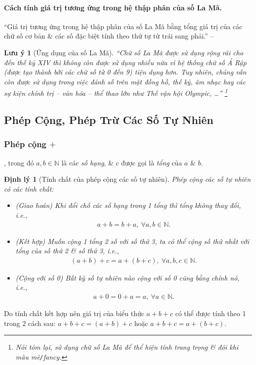 \documentclass{article}
\numberwithin{equation}{section}
\newtheorem{theorem}{Định lý}[section]
\newtheorem{remark}{Lưu ý}[section]
\begin{document}
\paragraph{Cách tính giá trị tương ứng trong hệ thập phân của số La Mã.} ``Giá trị tương ứng trong hệ thập phân của số La Mã bằng tổng giá trị của các chữ số cơ bản \& các số đặc biệt tính theo thứ tự từ trái sang phải.'' -- \cite[p. 14]{Thai_Anh_Dat_Ha_Loan_Nam_Quang_Toan_6_tap_1}

\begin{remark}[Ứng dụng của số La Mã]
	``Chữ số La Mã được sử dụng rộng rãi cho đến thế kỷ XIV thì không còn được sử dụng nhiều nữa vì hệ thống chữ số Ả Rập (được tạo thành bởi các chữ số từ 0 đến 9) tiện dụng hơn. Tuy nhiên, chúng vẫn còn được sử dụng trong việc đánh số trên mặt đồng hồ, thế kỷ, âm nhạc hay các sự kiện chính trị -- văn hóa -- thể thao lớn như Thế vận hội Olympic, \ldots'' \footnote{Nói tóm lại, sử dụng chữ số La Mã để thể hiện tính trang trọng \& đôi khi màu mè\texttt{/}fancy.}
\end{remark}

\subsection{Phép Cộng, Phép Trừ Các Số Tự Nhiên}

\subsubsection{Phép cộng $+$}
, trong đó $a,b\in\mathbb{N}$ là các \textit{số hạng}, \& $c$ được gọi là \textit{tổng} của $a$ \& $b$.

\begin{theorem}[Tính chất của phép cộng các số tự nhiên]
	Phép cộng các số tự nhiên có các tính chất:
	\begin{itemize}
		\item (Giao hoán) Khi đổi chỗ các số hạng trong 1 tổng thì tổng không thay đổi, i.e.,
		\begin{align*}
			a + b = b + a,\ \forall a,b\in\mathbb{N}.
		\end{align*}
		\item (Kết hợp) Muốn cộng 1 tổng 2 số với số thứ 3, ta có thể cộng số thứ nhất với tổng của số thứ 2 \& số thứ 3, i.e.,
		\begin{align*}
			(a + b) + c = a +(b + c),\ \forall a,b,c\in\mathbb{N}.
		\end{align*}
		\item (Cộng với số 0) Bất kỳ số tự nhiên nào cộng với số 0 cũng bằng chính nó, i.e.,
		\begin{align*}
			a + 0 = 0 + a = a,\ \forall a\in\mathbb{N}.
		\end{align*}
	\end{itemize}
\end{theorem}
Do tính chất kết hợp nên giá trị của biểu thức $a + b + c$ có thể được tính theo 1 trong 2 cách sau: $a + b + c = (a + b) + c$ hoặc $a + b + c = a + (b + c)$.
\end{document}
